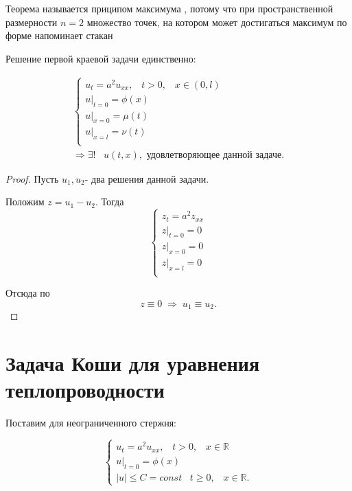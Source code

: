\begin{remark}
	Теорема называется приципом максимума , потому что при пространственной размерности $n=2$ множество точек, на котором может достигаться максимум по форме напоминает стакан
\end{remark}

\begin{conseq}
	Решение первой краевой задачи единственно:
	
	\begin{gather*}
		\begin{cases}
			u_t = a^2u_{xx}, \; \; \;t > 0, \; \; \;x \in (0,l)\\
			u|_{t = 0} = \phi(x)\\
			u|_{x = 0} = \mu(t)\\
			u|_{x = l} = \nu(t)\\	
		\end{cases}\\
		\Rightarrow \exists ! \; \; \; u(t,x), \text{ удовлетворяющее данной задаче.}
	\end{gather*}
\end{conseq}

\begin{proof}
	Пусть $u_1, u_2$- два решения данной задачи.

	Положим $z = u_1 - u_2.$ Тогда
	\[
		\begin{cases}
			z_t = a^2z_{xx}\\
			z|_{t=0}=0\\
			z|_{x=0} = 0\\
			z|_{x=l} = 0\\
		\end{cases}
	\]

	Отсюда по 
	\[
		z \equiv 0 \; \Rightarrow \; u_1 \equiv u_2.
	\]
	
\end{proof}

\section{Задача Коши для уравнения теплопроводности} %
\label{sec:cauchy_parab}

Поставим  для неограниченного стержня:

\[
	\begin{cases}
		u_t = a^2u_{xx}, \; \; \; t > 0, \; \; \; x \in \mathbb{R}\\
		u|_{t=0} = \phi(x)\\
		|u| \leq C = const \; \; \; t \geq 0, \; \; \; x \in \mathbb{R}.
	\end{cases}
\]

